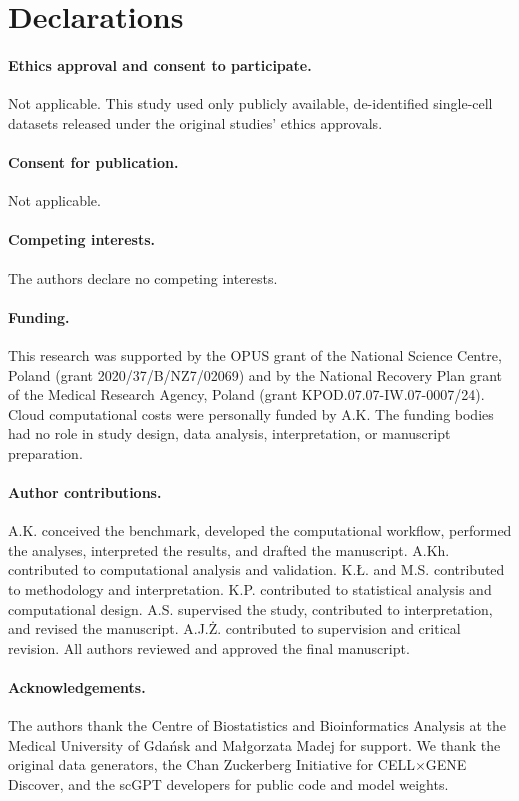 \section*{Declarations}

\paragraph{Ethics approval and consent to participate.} Not applicable. This study used only publicly available, de-identified single-cell datasets released under the original studies' ethics approvals.

\paragraph{Consent for publication.} Not applicable.

\paragraph{Competing interests.} The authors declare no competing interests.

\paragraph{Funding.} This research was supported by the OPUS grant of the National Science Centre, Poland (grant 2020/37/B/NZ7/02069) and by the National Recovery Plan grant of the Medical Research Agency, Poland (grant KPOD.07.07-IW.07-0007/24). Cloud computational costs were personally funded by A.K. The funding bodies had no role in study design, data analysis, interpretation, or manuscript preparation.

\paragraph{Author contributions.} A.K. conceived the benchmark, developed the computational workflow, performed the analyses, interpreted the results, and drafted the manuscript. A.Kh. contributed to computational analysis and validation. K.{\L}. and M.S. contributed to methodology and interpretation. K.P. contributed to statistical analysis and computational design. A.S. supervised the study, contributed to interpretation, and revised the manuscript. A.J.{\.Z}. contributed to supervision and critical revision. All authors reviewed and approved the final manuscript.

\paragraph{Acknowledgements.} The authors thank the Centre of Biostatistics and Bioinformatics Analysis at the Medical University of Gda\'nsk and Ma{\l}gorzata Madej for support. We thank the original data generators, the Chan Zuckerberg Initiative for CELL$\times$GENE Discover, and the scGPT developers for public code and model weights.
